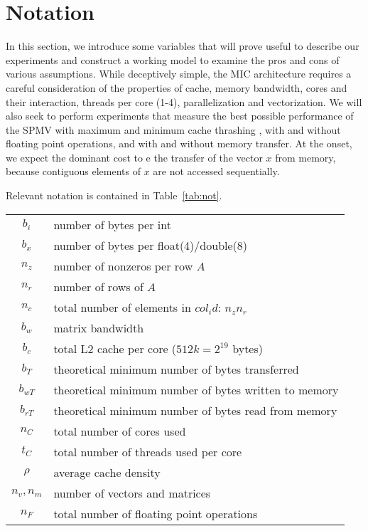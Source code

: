 \section{Notation}
In this section, we introduce some variables that will prove useful to 
describe our experiments and construct a working model to examine the pros and cons of various assumptions. While deceptively simple, the MIC architecture requires a careful consideration of the properties of cache, memory bandwidth, cores and their interaction, threads per core (1-4), parallelization and vectorization. We will also seek to perform experiments that measure the best possible performance of the SPMV with maximum and minimum cache thrashing , with and without floating point operations, and with and without memory transfer. At the onset, we expect the dominant cost to e the transfer of the vector $x$ from memory, because contiguous elements of $x$ are not accessed sequentially. 

Relevant notation is contained in Table~\ref{tab:not}. 

\begin{center}
\begin{tabular}{|c|l|}
\hline
$b_i$ & number of bytes per int \\
$b_x$ & number of bytes per float(4)/double(8) \\
$n_z$ & number of nonzeros per row $A$ \\
$n_r$ & number of rows of $A$ \\
$n_c$ & total number of elements in $col_id$: $n_z n_r$ \\
$b_w$ & matrix bandwidth \\
$b_c$ & total L2 cache per core ($512k=2^{19}$ bytes) \\
$b_T$ & theoretical minimum number of bytes transferred  \\
$b_{wT}$ & theoretical minimum number of bytes written to memory  \\
$b_{rT}$ & theoretical minimum number of bytes read from memory  \\
$n_C$ & total number of cores used  \\
$t_C$ & total number of threads used per core \\
$\rho$ & average cache density  \\
$n_v, n_m$ & number of vectors and matrices \\
$n_F$ & total number of floating point operations  \\
\hline
\end{tabular}
\end{center}

